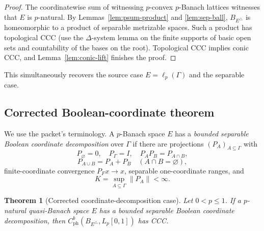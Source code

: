 \documentclass[11pt]{article}
\newtheorem{theorem}{Theorem}[section]
\theoremstyle{definition}
\newcommand{\Lp}{L_p[0,1]}
\newcommand{\cph}{C_{\mathrm{ph}}^b}
\newcommand{\norm}[1]{\left\lVert #1\right\rVert}
\begin{document}
\begin{proof}
The coordinatewise sum of witnessing $p$-convex $p$-Banach lattices witnesses
that $E$ is $p$-natural.  By Lemmas~\ref{lem:psum-product} and
\ref{lem:sep-ball}, $B_{E^\triangle}$ is homeomorphic to a product of separable
metrizable spaces.  Such a product has topological CCC (use the
$\Delta$-system lemma on the finite supports of basic open sets and countability
of the bases on the root).  Topological CCC implies conic CCC, and
Lemma~\ref{lem:conic-lift} finishes the proof.
\end{proof}

This simultaneously recovers the source case $E=\ell_p(\Gamma)$ and the
separable case.

\subsection{Corrected Boolean-coordinate theorem}

We use the packet's terminology.  A $p$-Banach space $E$ has a
\emph{bounded separable Boolean coordinate decomposition} over $\Gamma$ if
there are projections $(P_A)_{A\subseteq\Gamma}$ with
\[
 P_\varnothing=0,\quad P_\Gamma=I,\quad P_AP_B=P_{A\cap B},
\]
\[
 P_{A\cup B}=P_A+P_B\quad(A\cap B=\varnothing),
\]
finite-coordinate convergence $P_Fx\to x$, separable one-coordinate ranges,
and
\[
 K=\sup_{A\subseteq\Gamma}\norm{P_A}<\infty.
\]

\begin{theorem}[Corrected coordinate-decomposition case]
\label{thm:boolean}
Let $0<p\leq1$.  If a $p$-natural quasi-Banach space $E$ has a bounded
separable Boolean coordinate decomposition, then
$\cph(B_{E^\triangle},\Lp)$ has CCC.
\end{theorem}
\end{document}
